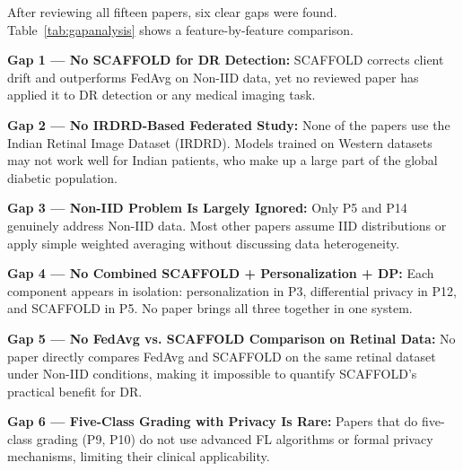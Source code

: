 \documentclass[12pt, a4paper]{article}
\begin{document}
After reviewing all fifteen papers, six clear gaps were found. Table~\ref{tab:gapanalysis} shows a feature-by-feature comparison.

\textbf{Gap 1 --- No SCAFFOLD for DR Detection:}
SCAFFOLD corrects client drift and outperforms FedAvg on Non-IID data, yet no reviewed paper has applied it to DR detection or any medical imaging task.

\textbf{Gap 2 --- No IRDRD-Based Federated Study:}
None of the papers use the Indian Retinal Image Dataset (IRDRD). Models trained on Western datasets may not work well for Indian patients, who make up a large part of the global diabetic population.

\textbf{Gap 3 --- Non-IID Problem Is Largely Ignored:}
Only P5 and P14 genuinely address Non-IID data. Most other papers assume IID distributions or apply simple weighted averaging without discussing data heterogeneity.

\textbf{Gap 4 --- No Combined SCAFFOLD + Personalization + DP:}
Each component appears in isolation: personalization in P3, differential privacy in P12, and SCAFFOLD in P5. No paper brings all three together in one system.

\textbf{Gap 5 --- No FedAvg vs. SCAFFOLD Comparison on Retinal Data:}
No paper directly compares FedAvg and SCAFFOLD on the same retinal dataset under Non-IID conditions, making it impossible to quantify SCAFFOLD's practical benefit for DR.

\textbf{Gap 6 --- Five-Class Grading with Privacy Is Rare:}
Papers that do five-class grading (P9, P10) do not use advanced FL algorithms or formal privacy mechanisms, limiting their clinical applicability.

\newpage
\end{document}
